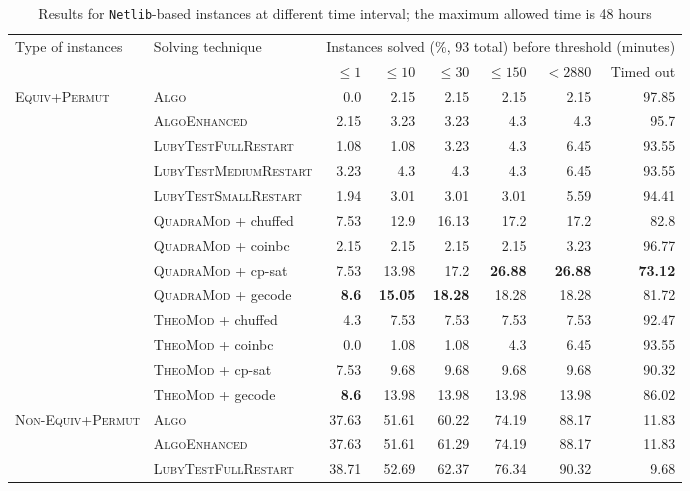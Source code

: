 \documentclass{book}
\begin{document}
\vspace{2cm}

\begin{table}[]\scriptsize\centering
\caption{Results for \texttt{Netlib}-based instances at different time interval; the maximum allowed time is 48 hours}
\begin{tabular}{@{}ll rr rr rr@{}}\toprule Type of instances & Solving technique  & \multicolumn{6}{c}{Instances solved (\%, 93 total) before threshold (minutes)}\\\cmidrule(l){3-8}&  &  $\leq 1$ &  $\leq 10$ &  $\leq 30$ &  $\leq 150$ &  $ < 2880$ & Timed out\\
\midrule
\multirow{10}{*}{\textsc{Equiv+Permut}} & \textsc{Algo}   & 0.0 & 2.15 & 2.15 & 2.15 & 2.15 & 97.85 \\
& \textsc{AlgoEnhanced}   & 2.15 & 3.23 & 3.23 & 4.3 & 4.3 & 95.7 \\
& \textsc{LubyTestFullRestart}   & 1.08 & 1.08 & 3.23 & 4.3 & 6.45 & 93.55 \\
& \textsc{LubyTestMediumRestart}   & 3.23 & 4.3 & 4.3 & 4.3 & 6.45 & 93.55 \\
& \textsc{LubyTestSmallRestart}   & 1.94 & 3.01 & 3.01 & 3.01 & 5.59 & 94.41 \\
& \textsc{QuadraMod} + chuffed   & 7.53 & 12.9 & 16.13 & 17.2 & 17.2 & 82.8 \\
& \textsc{QuadraMod} + coinbc   & 2.15 & 2.15 & 2.15 & 2.15 & 3.23 & 96.77 \\
& \textsc{QuadraMod} + cp-sat   & 7.53 & 13.98 & 17.2 & \bf 26.88 & \bf 26.88 &  \bf 73.12 \\
& \textsc{QuadraMod} + gecode   & \bf 8.6 & \bf 15.05 & \bf 18.28 & 18.28 & 18.28 & 81.72 \\
& \textsc{TheoMod} + chuffed   & 4.3 & 7.53 & 7.53 & 7.53 & 7.53 & 92.47 \\
& \textsc{TheoMod} + coinbc   & 0.0 & 1.08 & 1.08 & 4.3 & 6.45 & 93.55 \\
& \textsc{TheoMod} + cp-sat   & 7.53 & 9.68 & 9.68 & 9.68 & 9.68 & 90.32 \\
& \textsc{TheoMod} + gecode   & \bf 8.6 & 13.98 & 13.98 & 13.98 & 13.98 & 86.02 \\
\midrule\multirow{10}{*}{\textsc{Non-Equiv+Permut}} & \textsc{Algo}   & 37.63 & 51.61 & 60.22 & 74.19 & 88.17 & 11.83 \\
& \textsc{AlgoEnhanced}   & 37.63 & 51.61 & 61.29 & 74.19 & 88.17 & 11.83 \\
& \textsc{LubyTestFullRestart}   & 38.71 & 52.69 & 62.37 & 76.34 & 90.32 & 9.68 \\

\end{tabular}
\end{table}
\end{document}
